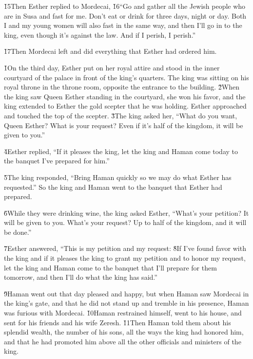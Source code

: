 \v{15}Then Esther replied to Mordecai, \v{16}``Go and gather all the Jewish people who are in Susa and fast for me. Don't eat or drink for three days, night or day. Both I and my young women will also fast in the same way, and then I'll go in to the king, even though it's against the law. And if I perish, I perish.''

\v{17}Then Mordecai left and did everything that Esther had ordered him.

\v{1}On the third day, Esther put on her royal attire and stood in the inner courtyard of the palace in front of the king's quarters. The king was sitting on his royal throne in the throne room, opposite the entrance to the building. \v{2}When the king saw Queen Esther standing in the courtyard, she won his favor, and the king extended to Esther the gold scepter that he was holding. Esther approached and touched the top of the scepter. \v{3}The king asked her, ``What do you want, Queen Esther? What is your request? Even if it's half of the kingdom, it will be given to you.''

\v{4}Esther replied, ``If it pleases the king, let the king and Haman come today to the banquet I've prepared for him.''

\v{5}The king responded, ``Bring Haman quickly so we may do what Esther has requested.'' So the king and Haman went to the banquet that Esther had prepared.

\v{6}While they were drinking wine, the king asked Esther, ``What's your petition? It will be given to you. What's your request? Up to half of the kingdom, and it will be done.''

\v{7}Esther answered, ``This is my petition and my request: \v{8}If I've found favor with the king and if it pleases the king to grant my petition and to honor my request, let the king and Haman come to the banquet that I'll prepare for them tomorrow, and then I'll do what the king has said.''

\v{9}Haman went out that day pleased and happy, but when Haman saw Mordecai in the king's gate, and that he did not stand up and tremble in his presence, Haman was furious with Mordecai. \v{10}Haman restrained himself, went to his house, and sent for his friends and his wife Zeresh. \v{11}Then Haman told them about his splendid wealth, the number of his sons, all the ways the king had honored him, and that he had promoted him above all the other officials and ministers of the king.

